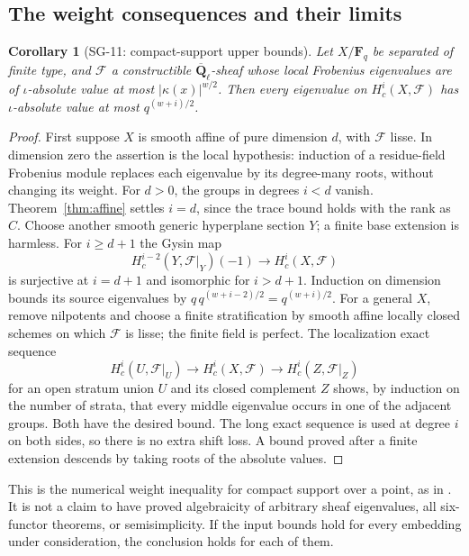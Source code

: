 \documentclass[11pt,a4paper]{article}
\newtheorem{corollary}[theorem]{Corollary}
\theoremstyle{remark}
\begin{document}
\subsection{The weight consequences and their limits}

\begin{corollary}[SG-11: compact-support upper bounds]
\label{cor:upper}
Let $X/\mathbf F_q$ be separated of finite type, and $\mathcal F$ a
constructible $\overline{\mathbf Q}_\ell$-sheaf whose local Frobenius
eigenvalues are of $\iota$-absolute value at most $|\kappa(x)|^{w/2}$.
Then every eigenvalue on $H_c^i(X,\mathcal F)$ has $\iota$-absolute
value at most $q^{(w+i)/2}$.
\end{corollary}
\begin{proof}
First suppose $X$ is smooth affine of pure dimension $d$, with
$\mathcal F$ lisse.  In dimension zero the assertion is the local
hypothesis: induction of a residue-field Frobenius module replaces
each eigenvalue by its degree-many roots, without changing its weight.
For $d>0$, the groups in degrees $i<d$ vanish.  Theorem~\ref{thm:affine}
settles $i=d$, since the trace bound holds with the rank as $C$.
Choose another smooth generic hyperplane section $Y$; a finite base
extension is harmless.  For $i\ge d+1$ the Gysin map
\[
 H_c^{i-2}(Y,\mathcal F|_Y)(-1)\longrightarrow H_c^i(X,\mathcal F)
\]
is surjective at $i=d+1$ and isomorphic for $i>d+1$.
Induction on dimension bounds its source eigenvalues by
$q\,q^{(w+i-2)/2}=q^{(w+i)/2}$.
For a general $X$, remove nilpotents and choose a finite stratification
by smooth affine locally closed schemes on which $\mathcal F$ is lisse;
the finite field is perfect.  The localization exact sequence
\[
 H_c^i(U,\mathcal F|_U)\longrightarrow H_c^i(X,\mathcal F)
                   \longrightarrow H_c^i(Z,\mathcal F|_Z)
\]
for an open stratum union $U$ and its closed complement $Z$ shows,
by induction on the number of strata, that every middle eigenvalue
occurs in one of the adjacent groups.  Both have the desired bound.
The long exact sequence is used at degree $i$ on both sides, so there
is no extra shift loss.  A bound proved after a finite extension
descends by taking roots of the absolute values.
\end{proof}

This is the numerical weight inequality for compact support over a point,
as in \cite[Theorem 3.3.1]{WeilII}.  It is not a claim to have proved
algebraicity of arbitrary sheaf eigenvalues, all six-functor theorems,
or semisimplicity.  If the input bounds hold for every embedding under
consideration, the conclusion holds for each of them.
\end{document}
